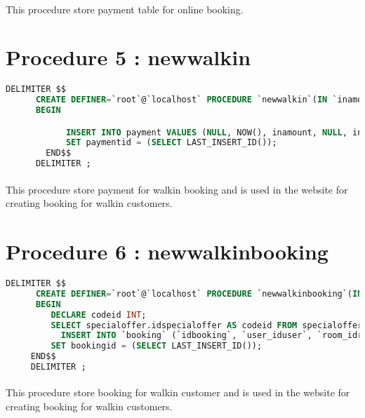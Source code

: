      \paragraph{}
        This procedure store payment table for online booking.

    \section{Procedure 5 : newwalkin}
    \ttfamily
      \begin{lstlisting}[language=SQL]
      DELIMITER $$
      CREATE DEFINER=`root`@`localhost` PROCEDURE `newwalkin`(IN `inamount` DECIMAL(10,2), IN `instaffid` INT, IN `incardno` VARCHAR(50), IN `inmethod` VARCHAR(20), OUT `paymentid` INT)
      BEGIN

        	INSERT INTO payment VALUES (NULL, NOW(), inamount, NULL, inmethod, incardno, instaffid, 'booking','');
            SET paymentid = (SELECT LAST_INSERT_ID());
        END$$
      DELIMITER ;
      \end{lstlisting}
      \rmfamily
      \paragraph{}
        This procedure store payment for walkin booking and is used in the website for creating booking for walkin customers.

    \section{Procedure 6 : newwalkinbooking}
    \ttfamily
      \begin{lstlisting}[language=SQL]
      DELIMITER $$
      CREATE DEFINER=`root`@`localhost` PROCEDURE `newwalkinbooking`(IN `infromdate` DATE, IN `intodate` DATE, IN `instaffid` INT, IN `inroomid` INT, IN `offer` VARCHAR(50), IN `paymentid` INT, OUT `bookingid` INT)
      BEGIN
  	     DECLARE codeid INT;
  	     SELECT specialoffer.idspecialoffer AS codeid FROM specialoffer WHERE specialoffer.code = offer;
     	   INSERT INTO `booking` (`idbooking`, `user_iduser`, `room_idroom`, `specialoffer_idspecialoffer`, `staff_idstaff`, `payment_idpayment`, `fromdate`, `todate`, `status`) VALUES (NULL, NULL, inroomid, codeid, instaffid, paymentid, infromdate, intodate, 'unchecked');
         SET bookingid = (SELECT LAST_INSERT_ID());
     END$$
     DELIMITER ;
      \end{lstlisting}
      \rmfamily
      \paragraph{}
        This procedure store booking for walkin customer  and is used in the website for creating booking for walkin customers.

